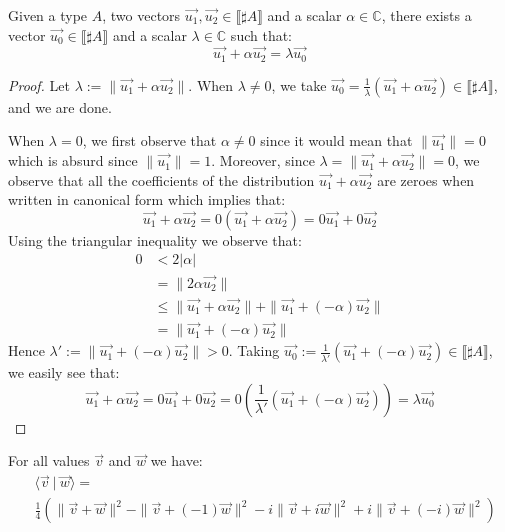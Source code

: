 \documentclass[runningheads,orivec]{llncs}
\def\C{\mathbb{C}}            %
\def\scal#1#2{\langle{#1}~|~{#2}\rangle}
\def\sem#1{\llbracket#1\rrbracket}
\begin{document}
\begin{lemma}\label{lem:VecRewrite}%
Given a type $A$, two vectors $\vec{u_1},\vec{u_2}\in\sem{\sharp A}$ and a scalar $\alpha\in\C$, there exists a vector $\vec{u_0}\in\sem{\sharp A}$ and a scalar $\lambda\in\C$ such that:
\[
\vec{u_1} + \alpha\vec{u_2} = \lambda \vec{u_0} 
\]
\end{lemma}
\begin{proof}
    Let $\lambda:=\|\vec{u_1}+\alpha\vec{u_2}\|$. When $\lambda\neq 0$, we take $\vec{u_0}=\frac{1}{\lambda}(\vec{u_1}+\alpha\vec{u_2})\in\sem{\sharp A}$, and we are done.

    When $\lambda=0$, we first observe that $\alpha\neq 0$ since it would mean that $\|\vec{u_1}\|=0$ which is absurd since $\|\vec{u_1}\|=1$. Moreover, since $\lambda=\|\vec{u_1}+\alpha\vec{u_2}\|=0$, we observe that all the coefficients of the distribution $\vec{u_1}+\alpha\vec{u_2}$ are zeroes when written in canonical form which implies that:
    \[
    \vec{u_1}+\alpha\vec{u_2} = 0(\vec{u_1}+\alpha\vec{u_2}) = 0\vec{u_1}+0\vec{u_2}
    \]
    Using the triangular inequality we observe that:
    \begin{align*}
    0 &< 2|\alpha|\\
    &= \|2\alpha\vec{u_2}\|\\
    &\leq\|\vec{u_1}+\alpha\vec{u_2}\| + \|\vec{u_1 }+ (-\alpha)\vec{u_2}\|\\
    &= \|\vec{u_1}+(-\alpha)\vec{u_2}\|
    \end{align*}
    Hence $\lambda' := \|\vec{u_1}+(-\alpha)\vec{u_2}\|>0$. Taking $\vec{u_0}:= \frac{1}{\lambda'}(\vec{u_1}+ (-\alpha)\vec{u_2})\in\sem{\sharp A}$, we easily see that:
    \[
    \vec{u_1}+\alpha\vec{u_2} = 0\vec{u_1} + 0\vec{u_2} = 0(\frac{1}{\lambda'} (\vec{u_1} + (-\alpha) \vec{u_2})) = \lambda \vec{u_0}
    \]
\end{proof}

\begin{proposition}\label{prop:Polarization} %
For all values $\vec{v}$ and $\vec{w}$ we have:
\begin{align*}
&\scal{\vec{v}}{\vec{w}}=\\
&\frac{1}{4} (\|\vec{v}+\vec{w}\|^2 - \|\vec{v} + (-1) \vec{w}\|^2 - i\|\vec{v} + i\vec{w}\|^2 + i\|\vec{v}+ (-i)\vec{w}\|^2)
\end{align*}
\end{proposition}
\end{document}
